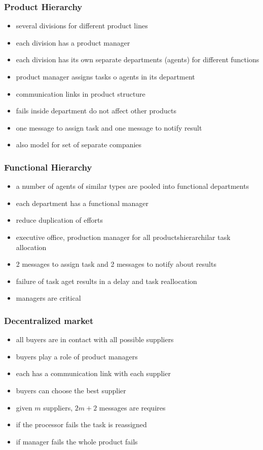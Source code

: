 \subsubsection{Product Hierarchy}
\missingfigure{}
\begin{itemize}
\item several divisions for different product lines
\item each division has a product manager
\item each division has its own separate departments (agents) for different functions
\item product manager assigns tasks o agents in its department
\item communication links in product structure
\item fails inside department do not affect other products
\item one message to assign task and one message to notify result 
\item also model for set of separate companies 
\end{itemize}

\subsubsection{Functional Hierarchy}
\missingfigure{}
\begin{itemize}
\item a number of agents of similar types are pooled into functional departments
\item each department has a functional manager
\item reduce duplication of efforts 
\item executive office, production manager for all productshierarchilar task allocation
\item 2 messages to assign task and 2 messages to notify about results
\item failure of task aget results in a delay and task reallocation
\item managers are critical
\end{itemize}

\subsubsection{Decentralized market}
\missingfigure{}
\begin{itemize}
\item all buyers are in contact with all possible suppliers
\item buyers play a role of product managers
\item each has a communication link with each supplier
\item buyers can choose the best supplier
\item given $m$ suppliers, $2m +2 $ messages are requires
\item if the processor fails the task is reassigned
\item if manager fails the whole product fails
\end{itemize}
